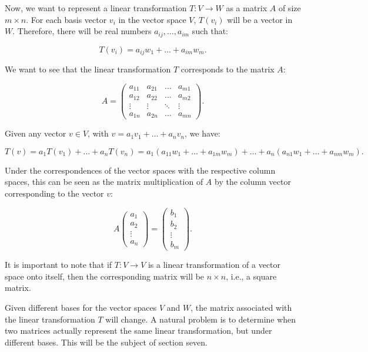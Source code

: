 \documentclass[
]{book}
\theoremstyle{definition}
\theoremstyle{definition}
\theoremstyle{definition}
\theoremstyle{definition}
\theoremstyle{remark}
\begin{document}
Now, we want to represent a linear transformation \(T: V \to W\) as a matrix \(A\) of size \(m \times n\). For each basis vector \(v_i\) in the vector space \(V\), \(T(v_i)\) will be a vector in \(W\). Therefore, there will be real numbers \(a_{ij}, \dots, a_{im}\) such that:

\[
T(v_i) = a_{ij}w_1 + \dots + a_{im}w_m.
\]

We want to see that the linear transformation \(T\) corresponds to the matrix \(A\):

\[
A = \begin{pmatrix} a_{11} & a_{21} & \dots & a_{m1} \\ a_{12} & a_{22} & \dots & a_{m2} \\ \vdots & \vdots & \ddots & \vdots \\ a_{1n} & a_{2n} & \dots & a_{mn} \end{pmatrix}.
\]

Given any vector \(v \in V\), with \(v = a_1v_1 + \dots + a_nv_n\), we have:

\[
T(v) = a_1T(v_1) + \dots + a_nT(v_n) = a_1(a_{11}w_1 + \dots + a_{1m}w_m) + \dots + a_n(a_{n1}w_1 + \dots + a_{nm}w_m).
\]

Under the correspondences of the vector spaces with the respective column spaces, this can be seen as the matrix multiplication of \(A\) by the column vector corresponding to the vector \(v\):

\[
A \begin{pmatrix} a_1 \\ a_2 \\ \vdots \\ a_n \end{pmatrix} = \begin{pmatrix} b_1 \\ b_2 \\ \vdots \\ b_m \end{pmatrix}.
\]

It is important to note that if \(T: V \to V\) is a linear transformation of a vector space onto itself, then the corresponding matrix will be \(n \times n\), i.e., a square matrix.

Given different bases for the vector spaces \(V\) and \(W\), the matrix associated with the linear transformation \(T\) will change. A natural problem is to determine when two matrices actually represent the same linear transformation, but under different bases. This will be the subject of section seven.
\end{document}

